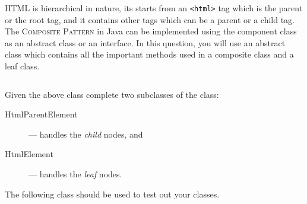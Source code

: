 \documentclass[12pt,a4paper]{exam}
\newcommand{\code}{/Users/keith/Documents/Courses/sdp/repo/worksheets/dp-two/kotlin/src}
\begin{document}
\begin{questions}
%
%
%
%
%
%
%
%
%

\question
HTML is hierarchical in nature, its starts from an \verb!<html>! tag which is the 
parent or the root tag, and it contains other tags which can be a parent or a child tag.
The \textsc{Composite Pattern} in Java can be implemented using the component class as an 
abstract class or an interface. In this question, you will use an abstract class which 
contains all the important methods used in a composite class and a leaf class.

\inputminted{scala}{\code/composite/HtmlTag.kt}

Given the above class complete two subclasses of the class:
\begin{description}
	\item[HtmlParentElement] --- handles the \emph{child} nodes, and
	\item[HtmlElement] --- handles the \emph{leaf} nodes.
\end{description}
The following class should be used to test out your classes.


\end{questions}
\end{document}
